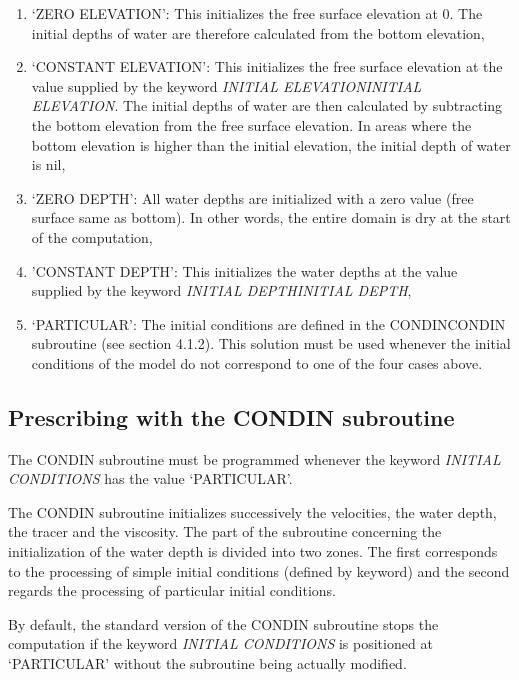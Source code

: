 \begin{enumerate}
\item  `ZERO ELEVATION': This initializes the free surface elevation at 0. The initial depths of water are therefore calculated from the bottom elevation,

\item  `CONSTANT ELEVATION': This initializes the free surface elevation at the value supplied by the keyword \textit{INITIAL ELEVATIONINITIAL ELEVATION}. The initial depths of water are then calculated by subtracting the bottom elevation from the free surface elevation. In areas where the bottom elevation is higher than the initial elevation, the initial depth of water is nil,

\item  `ZERO DEPTH': All water depths are initialized with a zero value (free surface same as bottom). In other words, the entire domain is dry at the start of the computation,

\item  'CONSTANT DEPTH': This initializes the water depths at the value supplied by the keyword \textit{INITIAL DEPTHINITIAL DEPTH},

\item  `PARTICULAR': The initial conditions are defined in the CONDINCONDIN subroutine (see section 4.1.2). This solution must be used whenever the initial conditions of the model do not correspond to one of the four cases above.
\end{enumerate}


\subsection{ Prescribing with the CONDIN subroutine}

 The CONDIN subroutine must be programmed whenever the keyword \textit{INITIAL CONDITIONS} has the value `PARTICULAR'.

 The CONDIN subroutine initializes successively the velocities, the water depth, the tracer and the viscosity. The part of the subroutine concerning the initialization of the water depth is divided into two zones. The first corresponds to the processing of simple initial conditions (defined by keyword) and the second regards the processing of particular initial conditions.

 By default, the standard version of the CONDIN subroutine stops the computation if the keyword \textit{INITIAL CONDITIONS} is positioned at `PARTICULAR' without the subroutine being actually modified.

